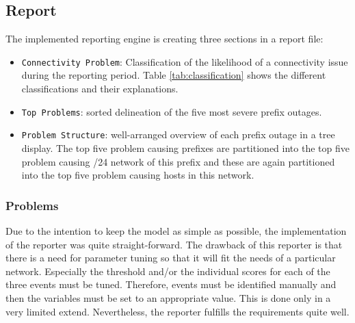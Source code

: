\subsection{Report} The implemented reporting engine is creating three sections
in a report file:
\begin{itemize}
	\item \texttt{Connectivity Problem}: Classification of the
	likelihood of a connectivity issue during the reporting period. Table
	\ref{tab:classification} shows the different classifications and their
	explanations.
	\item \texttt{Top Problems}: sorted delineation of the five most severe prefix
	outages.
	\item \texttt{Problem Structure}: well-arranged overview of each prefix outage
	in a tree display. The top five problem causing prefixes are partitioned into
	the top five problem causing /24 network of this prefix and these are again
	partitioned into the top five problem causing hosts in this network.
\end{itemize}
\begin{table}
	[t] 
	\newpage  
\end{table}

\subsubsection{Problems} Due to the intention to keep the model as simple as
possible, the implementation of the reporter was quite straight-forward. The
drawback of this reporter is that there is a need for parameter tuning so that
it will fit the needs of a particular network. Especially the threshold and/or
the individual scores for each of the three events must be tuned. Therefore,
events must be identified manually and then the variables must be set to an
appropriate value. This is done only in a very limited extend. Nevertheless, the
reporter fulfills the requirements quite well.
